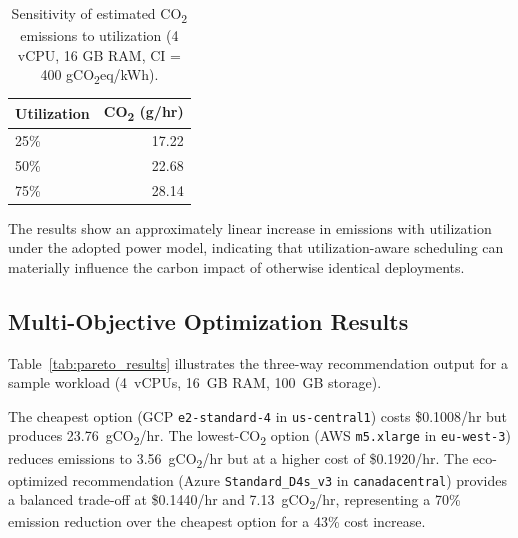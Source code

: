 \documentclass[conference]{IEEEtran}
\begin{document}
\begin{table}[htbp]
\centering
\caption{Sensitivity of estimated CO\textsubscript{2} emissions to utilization (4 vCPU, 16 GB RAM, CI = 400 gCO\textsubscript{2}eq/kWh).}
\label{tab:utilization_sensitivity}
\small
\begin{tabular}{lr}
\toprule
\textbf{Utilization} & \textbf{CO\textsubscript{2} (g/hr)} \\
\midrule
25\% & 17.22 \\
50\% & 22.68 \\
75\% & 28.14 \\
\bottomrule
\end{tabular}
\end{table}

The results show an approximately linear increase in emissions with utilization under the adopted power model, indicating that utilization-aware scheduling can materially influence the carbon impact of otherwise identical deployments.

\subsection{Multi-Objective Optimization Results}

Table~\ref{tab:pareto_results} illustrates the three-way recommendation output for a sample workload (4~vCPUs, 16~GB RAM, 100~GB storage).

\begin{table}[htbp]
\centering
\caption{Multi-objective recommendation comparison for 4 vCPU, 16 GB workload.}
\label{tab:pareto_results}
\small
{}
\end{table}

The cheapest option (GCP \texttt{e2-standard-4} in \texttt{us-central1}) costs \$0.1008/hr but produces 23.76~gCO\textsubscript{2}/hr. The lowest-CO\textsubscript{2} option (AWS \texttt{m5.xlarge} in \texttt{eu-west-3}) reduces emissions to 3.56~gCO\textsubscript{2}/hr but at a higher cost of \$0.1920/hr. The eco-optimized recommendation (Azure \texttt{Standard\_D4s\_v3} in \texttt{canadacentral}) provides a balanced trade-off at \$0.1440/hr and 7.13~gCO\textsubscript{2}/hr, representing a 70\% emission reduction over the cheapest option for a 43\% cost increase.
\end{document}
